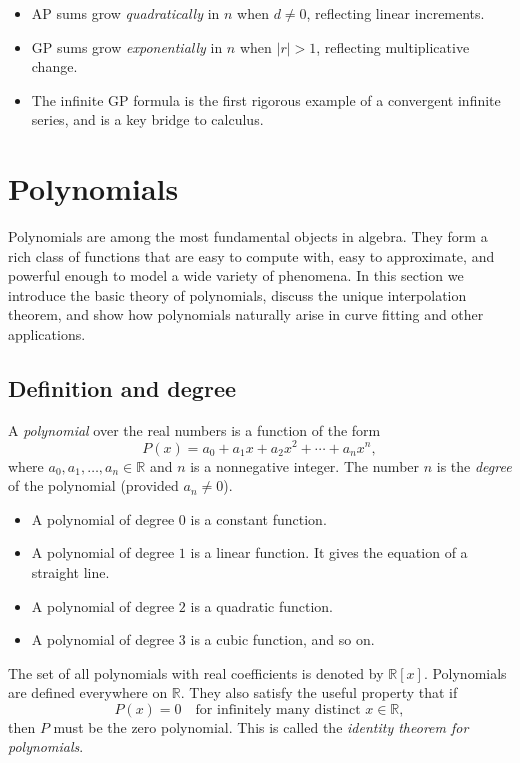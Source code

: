 \begin{itemize}
    \item AP sums grow \emph{quadratically} in $n$ when $d\neq 0$,
          reflecting linear increments.
    \item GP sums grow \emph{exponentially} in $n$ when $|r|>1$,
          reflecting multiplicative change.
    \item The infinite GP formula is the first rigorous example of
          a convergent infinite series, and is a key bridge to calculus.
\end{itemize}

\section{Polynomials}

Polynomials are among the most fundamental objects in algebra.  They form
a rich class of functions that are easy to compute with, easy to
approximate, and powerful enough to model a wide variety of phenomena.
In this section we introduce the basic theory of polynomials, discuss the
unique interpolation theorem, and show how polynomials naturally arise in
curve fitting and other applications.

\subsection{Definition and degree}

A \emph{polynomial} over the real numbers is a function of the form
\[
P(x) = a_0 + a_1 x + a_2 x^2 + \cdots + a_n x^n,
\]
where $a_0,a_1,\dots,a_n\in\mathbb{R}$ and $n$ is a nonnegative integer.
The number $n$ is the \emph{degree} of the polynomial (provided $a_n\neq 0$).

\begin{itemize}
    \item A polynomial of degree $0$ is a constant function.
    \item A polynomial of degree $1$ is a linear function. It gives the equation of a straight line.
    \item A polynomial of degree $2$ is a quadratic function.
    \item A polynomial of degree $3$ is a cubic function, and so on.
\end{itemize}

The set of all polynomials with real coefficients is denoted by
$\mathbb{R}[x]$.  Polynomials are defined everywhere on $\mathbb{R}$.  They also satisfy the useful property that if
\[
P(x)=0\quad\text{for infinitely many distinct }x\in\mathbb{R},
\]
then $P$ must be the zero polynomial.  This is called the
\emph{identity theorem for polynomials}.

